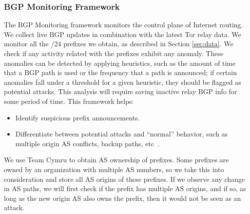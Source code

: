 
\subsubsection{BGP Monitoring Framework} 
\label{sec:bgp}
The BGP Monitoring framework monitors the control plane of Internet routing. We collect live BGP updates in combination with the latest Tor relay data. We monitor all the /24 prefixes we obtain, as described in Section \ref{sec:data}. We check if any activity related with the prefixes exhibit any anomaly. These anomalies can be detected by applying heuristics, such as the amount of time that a BGP path is used or the frequency that a path is announced; if certain anomalies fall under a threshold for a given heuristic, they should be flagged as potential attacks. This analysis will require saving inactive relay BGP info for some period of time.  This framework helps:

\begin{itemize}
\item Identify suspicious prefix announcements.
\item Differentiate between potential attacks and ``normal'' behavior, such as multiple origin AS conflicts, backup paths, etc~\cite{zhao2001analysis}.
\end{itemize}

We use Team Cymru \cite{teamcymru} to obtain AS ownership of prefixes. Some prefixes are owned by an organization with multiple AS numbers, so we take this into consideration and store all AS origins of these prefixes. If we observe any change in AS paths, we will first check if the prefix has multiple AS origins, and if so, as long as the new origin AS also owns the prefix, then it would not be seen as an attack. 

